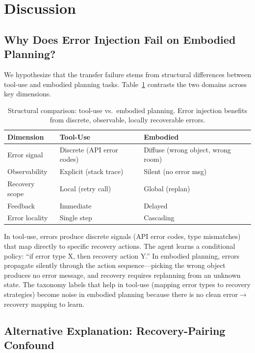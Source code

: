 \section{Discussion}
\label{sec:discussion}

\subsection{Why Does Error Injection Fail on Embodied Planning?}
\label{sec:structural_hypothesis}

We hypothesize that the transfer failure stems from structural differences between tool-use and embodied planning tasks. Table~\ref{tab:structural} contrasts the two domains across key dimensions.

\begin{table}[t]
\centering
\small
\begin{tabular}{p{2.2cm}p{2.3cm}p{2.3cm}}
\toprule
\textbf{Dimension} & \textbf{Tool-Use} \cite{paladin2025} & \textbf{Embodied} \\
\midrule
Error signal & Discrete (API error codes) & Diffuse (wrong object, wrong room) \\
Observability & Explicit (stack trace) & Silent (no error msg) \\
Recovery scope & Local (retry call) & Global (replan) \\
Feedback & Immediate & Delayed \\
Error locality & Single step & Cascading \\
\bottomrule
\end{tabular}
\caption{Structural comparison: tool-use vs.\ embodied planning. Error injection benefits from discrete, observable, locally recoverable errors.}
\label{tab:structural}
\end{table}

In tool-use, errors produce discrete signals (API error codes, type mismatches) that map directly to specific recovery actions. The agent learns a conditional policy: ``if error type X, then recovery action Y.'' In embodied planning, errors propagate silently through the action sequence---picking the wrong object produces no error message, and recovery requires replanning from an unknown state. The taxonomy labels that help in tool-use (mapping error types to recovery strategies) become noise in embodied planning because there is no clean error$\to$recovery mapping to learn.

\subsection{Alternative Explanation: Recovery-Pairing Confound}
\label{sec:confound}


